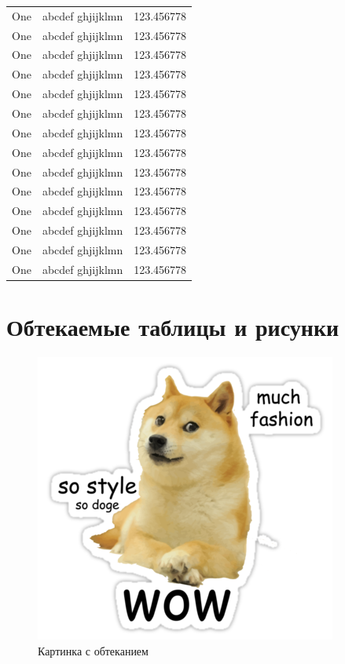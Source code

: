 \documentclass[12pt, a4paper]{article}
\begin{document}
\begin{center}
\begin{longtable}{|l|l|l|}
One & abcdef ghjijklmn & 123.456778 \\
One & abcdef ghjijklmn & 123.456778 \\
One & abcdef ghjijklmn & 123.456778 \\
One & abcdef ghjijklmn & 123.456778 \\
One & abcdef ghjijklmn & 123.456778 \\
One & abcdef ghjijklmn & 123.456778 \\
One & abcdef ghjijklmn & 123.456778 \\
One & abcdef ghjijklmn & 123.456778 \\
One & abcdef ghjijklmn & 123.456778 \\
One & abcdef ghjijklmn & 123.456778 \\
One & abcdef ghjijklmn & 123.456778 \\
One & abcdef ghjijklmn & 123.456778 \\
One & abcdef ghjijklmn & 123.456778 \\
One & abcdef ghjijklmn & 123.456778 \\
\end{longtable}
\end{center}


\section{Обтекаемые таблицы и рисунки}

\begin{figure}
	\includegraphics[width=\linewidth]{doge.png}
	\caption{Картинка с обтеканием}
\end{figure}
\end{document}
